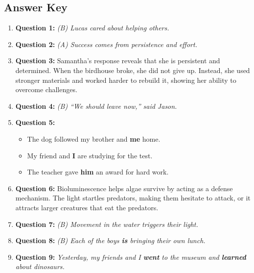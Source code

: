 \documentclass[12pt]{article}
\begin{document}
\subsection*{Answer Key}
\begin{enumerate}
    \item \textbf{Question 1:} \textit{(B) Lucas cared about helping others.}

    \item \textbf{Question 2:} \textit{(A) Success comes from persistence and effort.}

    \item \textbf{Question 3:}  
    Samantha’s response reveals that she is persistent and determined. When the birdhouse broke, she did not give up. Instead, she used stronger materials and worked harder to rebuild it, showing her ability to overcome challenges.

    \item \textbf{Question 4:} \textit{(B) “We should leave now,” said Jason.}

    \item \textbf{Question 5:}  
    \begin{itemize}
        \item The dog followed my brother and \textbf{me} home.  
        \item My friend and \textbf{I} are studying for the test.  
        \item The teacher gave \textbf{him} an award for hard work.  
    \end{itemize}

    \item \textbf{Question 6:}  
    Bioluminescence helps algae survive by acting as a defense mechanism. The light startles predators, making them hesitate to attack, or it attracts larger creatures that eat the predators.

    \item \textbf{Question 7:} \textit{(B) Movement in the water triggers their light.}

    \item \textbf{Question 8:} \textit{(B) Each of the boys \textbf{is} bringing their own lunch.}

    \item \textbf{Question 9:}  
    \textit{Yesterday, my friends and I \textbf{went} to the museum and \textbf{learned} about dinosaurs.}


\end{enumerate}
\end{document}
